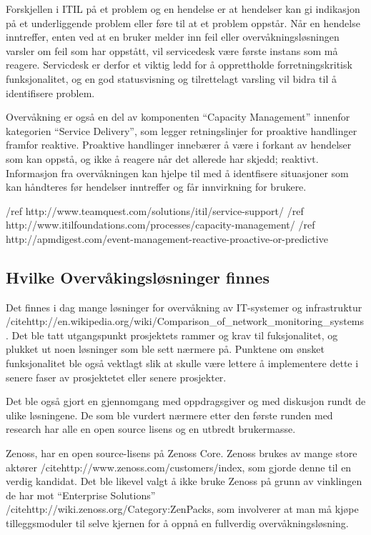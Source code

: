 Forskjellen i ITIL på et problem og en hendelse er at hendelser kan gi indikasjon på et underliggende problem eller føre til at et problem oppstår. Når en hendelse inntreffer, enten ved at en bruker melder inn feil eller overvåkningsløsningen varsler om feil som har oppstått, vil servicedesk være første instans som må reagere. Servicdesk er derfor et viktig ledd for å opprettholde forretningskritisk funksjonalitet, og en god statusvisning og tilrettelagt varsling vil bidra til å identifisere problem.

Overvåkning er også en del av komponenten “Capacity Management” innenfor kategorien “Service Delivery”, som legger retningslinjer for proaktive handlinger framfor reaktive. Proaktive handlinger innebærer å være i forkant av hendelser som kan oppstå, og ikke å reagere når det allerede har skjedd; reaktivt. Informasjon fra overvåkningen kan hjelpe til med å identfisere situasjoner som kan håndteres før hendelser inntreffer og får innvirkning for brukere.

/ref http://www.teamquest.com/solutions/itil/service-support/
/ref http://www.itilfoundations.com/processes/capacity-management/
/ref http://apmdigest.com/event-management-reactive-proactive-or-predictive

\subsection{Hvilke Overvåkingsløsninger finnes}
Det finnes i dag mange løsninger for overvåkning av IT-systemer og infrastruktur /cite{http://en.wikipedia.org/wiki/Comparison\_of\_network\_monitoring\_systems}. Det ble tatt utgangspunkt prosjektets rammer og krav til fuksjonalitet, og plukket ut noen løsninger som ble sett nærmere på. Punktene om ønsket funksjonalitet ble også vektlagt slik at skulle være lettere å implementere dette i senere faser av prosjektetet eller senere prosjekter. 

Det ble også gjort en gjennomgang med oppdragsgiver og med diskusjon rundt de ulike løsningene. De som ble vurdert nærmere etter den første runden med research har alle en open source lisens og en utbredt brukermasse. 

Zenoss, har en open source-lisens på Zenoss Core. Zenoss brukes av mange store aktører /cite{http://www.zenoss.com/customers/index}, som gjorde denne til en verdig kandidat. Det ble likevel valgt å ikke bruke Zenoss på grunn av vinklingen de har mot “Enterprise Solutions” /cite{http://wiki.zenoss.org/Category:ZenPacks}, som involverer at man må kjøpe tilleggsmoduler til selve kjernen for å oppnå en fullverdig overvåkningsløsning.

